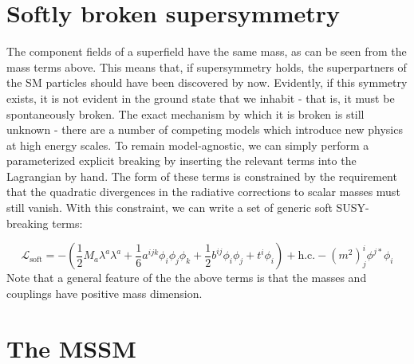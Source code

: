 \section{Softly broken supersymmetry}
The component fields of a superfield have the same mass, as can be seen from the mass terms above. This means that, if supersymmetry holds, the superpartners of the SM particles should have been discovered by now. Evidently, if this symmetry exists, it is not evident in the ground state that we inhabit - that is, it must be spontaneously broken. The exact mechanism by which it is broken is still unknown - there are a number of competing models which introduce new physics at high energy scales. To remain model-agnostic, we can simply perform a parameterized explicit breaking by inserting the relevant terms into the Lagrangian by hand. The form of these terms is constrained by the requirement that the quadratic divergences in the radiative corrections to scalar masses must still vanish. With this constraint, we can write a set of generic soft SUSY-breaking terms:

\[\mathcal{L}_\text{soft} = -\left(\frac{1}{2}M_a\lambda^a\lambda^a+\frac{1}{6}a^{ijk}\phi_i\phi_j\phi_k+\frac{1}{2}b^{ij}\phi_i\phi_j+t^i\phi_i\right)+\text{h.c.}-(m^2)_j^i\phi^{j*}\phi_i\]
Note that a general feature of the the above terms is that the masses and couplings have positive mass dimension.

\section{The MSSM}

